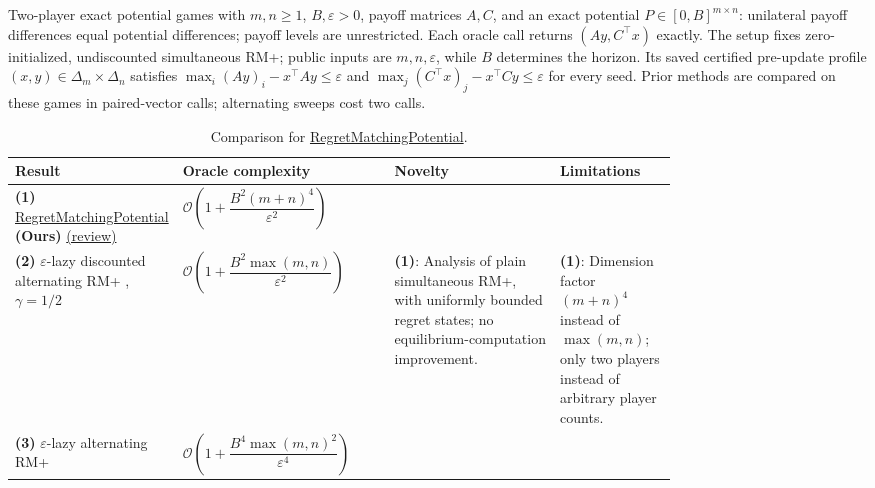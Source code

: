 \begin{table}[tp]
\centering
\caption{Comparison for \href{https://github.com/k3nfalt/longtails/blob/main/LongTails/Setups/RegretMatchingPotential.lean}{RegretMatchingPotential}.}\label{tab:RegretMatchingPotential}
\parbox{\linewidth}{\footnotesize Two-player exact potential games with $m,n\geq1$, $B,\varepsilon>0$, payoff matrices $A,C$, and an exact potential $P\in[0,B]^{m\times n}$: unilateral payoff differences equal potential differences; payoff levels are unrestricted. Each oracle call returns $(Ay,C^\top x)$ exactly. The setup fixes zero-initialized, undiscounted simultaneous RM+; public inputs are $m,n,\varepsilon$, while $B$ determines the horizon. Its saved certified pre-update profile $(x,y)\in\Delta_m\times\Delta_n$ satisfies $\max_i(Ay)_i-x^\top Ay\leq\varepsilon$ and $\max_j(C^\top x)_j-x^\top Cy\leq\varepsilon$ for every seed. Prior methods are compared on these games in paired-vector calls; alternating sweeps cost two calls.}\par\smallskip
\begin{threeparttable}
\footnotesize
\setlength{\tabcolsep}{4pt}\renewcommand{\arraystretch}{1.25}
\begin{tabularx}{\linewidth}{@{}>{\raggedright\arraybackslash}p{0.20\linewidth}>{\raggedright\arraybackslash}p{0.32\linewidth}>{\raggedright\arraybackslash}p{0.25\linewidth}>{\raggedright\arraybackslash}X@{}}
\toprule
\textbf{Result} & \textbf{Oracle complexity} & \textbf{Novelty} & \textbf{Limitations} \\
\midrule
\textbf{(1)} \href{https://github.com/k3nfalt/longtails/blob/main/LongTails/Theorems/RegretMatchingPotential.lean}{Regret\allowbreak Matching\allowbreak Potential} \textbf{(Ours)} \href{https://github.com/k3nfalt/longtails/blob/main/scripts/reviews/RegretMatchingPotential.md}{(review)}
& $\mathcal{O}\!\left(1+\dfrac{B^2(m+n)^4}{\varepsilon^2}\right)$ & & \\
\midrule[1.2pt]
\textbf{(2)} $\varepsilon$-lazy discounted alternating RM+ \citep[Cor.~3.5]{rmpAnagnostides2025v2}, $\gamma=1/2$
& $\mathcal{O}\!\left(1+\dfrac{B^2\max(m,n)}{\varepsilon^2}\right)$
& \textbf{(1)}: Analysis of plain simultaneous RM+, with uniformly bounded regret states; no equilibrium-computation improvement.
& \textbf{(1)}: Dimension factor $(m+n)^4$ instead of $\max(m,n)$; only two players instead of arbitrary player counts. \\
\midrule
\textbf{(3)} $\varepsilon$-lazy alternating RM+ \citep[Thm.~3.4]{rmpAnagnostides2025v2}
& $\mathcal{O}\!\left(1+\dfrac{B^4\max(m,n)^2}{\varepsilon^4}\right)$

\end{tabularx}
\end{threeparttable}
\end{table}
